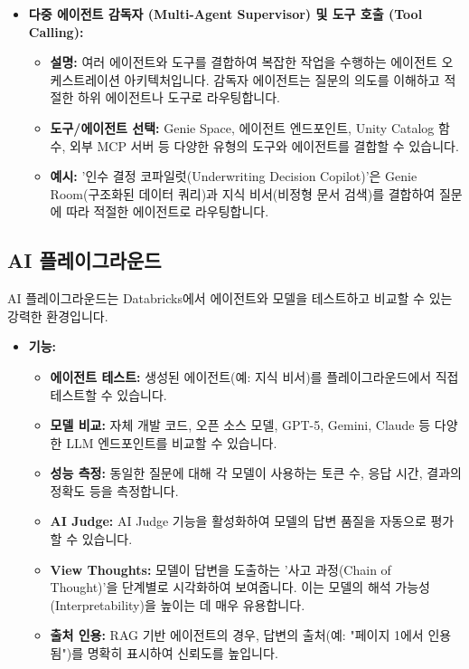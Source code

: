 \documentclass[11pt,a4paper]{article}
\theoremstyle{definition}
\begin{document}
\begin{itemize}
    \item \textbf{다중 에이전트 감독자 (Multi-Agent Supervisor) 및 도구 호출 (Tool Calling):}
    \begin{itemize}
        \item \textbf{설명:} 여러 에이전트와 도구를 결합하여 복잡한 작업을 수행하는 에이전트 오케스트레이션 아키텍처입니다. 감독자 에이전트는 질문의 의도를 이해하고 적절한 하위 에이전트나 도구로 라우팅합니다.
        \item \textbf{도구/에이전트 선택:} Genie Space, 에이전트 엔드포인트, Unity Catalog 함수, 외부 MCP 서버 등 다양한 유형의 도구와 에이전트를 결합할 수 있습니다.
        \item \textbf{예시:} '인수 결정 코파일럿(Underwriting Decision Copilot)'은 Genie Room(구조화된 데이터 쿼리)과 지식 비서(비정형 문서 검색)를 결합하여 질문에 따라 적절한 에이전트로 라우팅합니다.
    \end{itemize}
\end{itemize}

\subsection{AI 플레이그라운드}

AI 플레이그라운드는 Databricks에서 에이전트와 모델을 테스트하고 비교할 수 있는 강력한 환경입니다.

\begin{itemize}
    \item \textbf{기능:}
    \begin{itemize}
        \item \textbf{에이전트 테스트:} 생성된 에이전트(예: 지식 비서)를 플레이그라운드에서 직접 테스트할 수 있습니다.
        \item \textbf{모델 비교:} 자체 개발 코드, 오픈 소스 모델, GPT-5, Gemini, Claude 등 다양한 LLM 엔드포인트를 비교할 수 있습니다.
        \item \textbf{성능 측정:} 동일한 질문에 대해 각 모델이 사용하는 토큰 수, 응답 시간, 결과의 정확도 등을 측정합니다.
        \item \textbf{AI Judge:} AI Judge 기능을 활성화하여 모델의 답변 품질을 자동으로 평가할 수 있습니다.
        \item \textbf{View Thoughts:} 모델이 답변을 도출하는 '사고 과정(Chain of Thought)'을 단계별로 시각화하여 보여줍니다. 이는 모델의 해석 가능성(Interpretability)을 높이는 데 매우 유용합니다.
        \item \textbf{출처 인용:} RAG 기반 에이전트의 경우, 답변의 출처(예: "페이지 1에서 인용됨")를 명확히 표시하여 신뢰도를 높입니다.
    \end{itemize}
\end{itemize}
\end{document}
